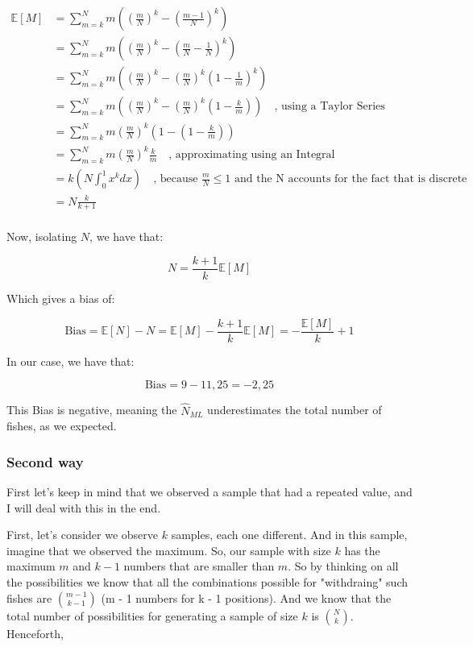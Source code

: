 \documentclass[12pt,a4paper,oneside]{paper}
\begin{document}
\begin{align*}
\mathbb{E}[M] &= \sum_{m = k}^{N} m \left( \left( \frac{m}{N} \right)^k - \left( \frac{m - 1}{N} \right)^k \right) \\
&= \sum_{m = k}^{N} m \left( \left( \frac{m}{N} \right)^k - \left( \frac{m}{N} - \frac{1}{N} \right)^k \right) \\
&= \sum_{m = k}^{N} m \left( \left( \frac{m}{N} \right)^k - \left( \frac{m}{N} \right)^k \left( 1 - \frac{1}{m} \right)^k \right) \\
&= \sum_{m = k}^{N} m \left( \left( \frac{m}{N} \right)^k - \left( \frac{m}{N} \right)^k \left( 1 - \frac{k}{m} \right) \right) \quad \text{, using a Taylor Series} \\
&= \sum_{m = k}^{N} m \left( \frac{m}{N} \right)^k  \left( 1 - \left( 1 - \frac{k}{m} \right) \right) \\
&= \sum_{m = k}^{N} m \left( \frac{m}{N} \right)^k \frac{k}{m} \quad \text{, approximating using an Integral} \\
&= k \left( N \int_{0}^{1} x^k dx \right) \quad \text{, because } \frac{m}{N} \leq 1 \text{ and the N accounts for the fact that is discrete} \\
&=  N \frac{k}{k + 1} \\
\end{align*}

Now, isolating $N$, we have that:

\[
N = \frac{k + 1}{k} \mathbb{E}[M]
\]

Which gives a bias of:

\[
\text{Bias} = \mathbb{E}[N] - N = \mathbb{E}[M] - \frac{k + 1}{k} \mathbb{E}[M] = - \frac{\mathbb{E}[M]}{k} + 1
\]

In our case, we have that:

\[
\text{Bias} = 9 - 11,25 = -2,25
\]

This Bias is negative, meaning the $\hat{N}_{ML}$ underestimates the total number of fishes, as we expected.


\subsubsection*{Second way}


First let's keep in mind that we observed a sample that had a repeated value, and I will deal with this in the end.

First, let's consider we observe $k$ samples, each one different. And in this sample, imagine that we observed the maximum. 
So, our sample with size $k$ has the maximum $m$ and $k - 1$ numbers that are smaller than $m$. 
So by thinking on all the possibilities we know that all the combinations possible for "withdraing" such fishes
are $\binom{m - 1}{k - 1}$ (m - 1 numbers for k - 1 positions). And we know that the total number of possibilities for
generating a sample of size $k$ is $\binom{N}{k}$. Henceforth,
\end{document}
